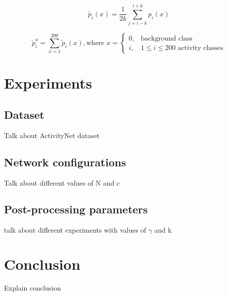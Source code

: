 \documentclass{article}
\begin{document}
\begin{equation}
	\tilde{p}_i(x) = \frac{1}{2k} \sum_{j=i-k}^{i+k} p_i(x)
    \label{eq:smooth}
\end{equation}

\begin{equation}
    \label{eq:activity_probability}
	\tilde{p}^a_i = \sum_{x=1}^{200}\tilde{p}_i(x), \text{where } x = \begin{cases}
        0, & \text{background class} \\
        i, & 1 \leq i \leq 200 \text{ activity classes}
    \end{cases}
\end{equation}

\section{Experiments}

\subsection{Dataset}

Talk about ActivityNet dataset

\subsection{Network configurations}

Talk about different values of N and c

\subsection{Post-processing parameters}

talk about different experiments with values of $\gamma$ and k

\section{Conclusion}

Explain conclusion



\section*{}
{\small


}
\end{document}
